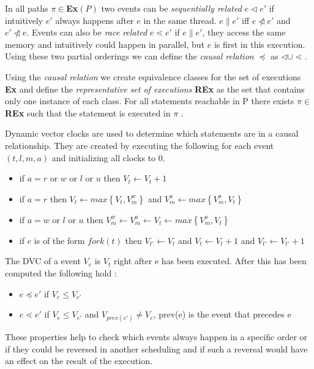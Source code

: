 \documentclass[10pt]{llncs}
\begin{document}
In all paths $\pi \in $\textbf{Ex}$(P)$ two events can be \emph{sequentially related} $e \triangleleft e'$ if intuitively $e'$ always happens after $e$ in the same thread. $e \parallel e'$ iff $e \ntriangleleft e'$ and $e' \ntriangleleft e$. Events can also be \emph{race related} $e \lessdot e'$ if $e \parallel e'$, they access the same memory and intuitively could happen in parallel, but $e$ is first in this execution. Using these two partial orderings we can define the \emph{causal relation} $\preceq$ as $\triangleleft \cup \lessdot$.

Using the \emph{causal relation} we create equivalence classes for the set of executions \textbf{Ex} and define the \emph{representative set of executions} \textbf{REx} as the set that contains only one instance of each class. For all statements reachable in P there exists $\pi \in$ \textbf{REx} such that the statement is executed in $\pi$ \cite[§4]{base4}.

Dynamic vector clocks are used to determine which statements are in a causal relationship. They are created by executing the following for each event $(t, l, m, a)$ and initializing all clocks to $0$.

\begin{itemize}
	\item if $a = r$ or $w$ or $l$ or $u$ then $V_t \leftarrow V_t + 1$
	\item if $a = r$ then $V_t \leftarrow max \left\lbrace V_t, V_m^w \right\rbrace$ and $V_m^a \leftarrow max \left\lbrace V_m^a, V_t \right\rbrace$
	\item  if $a = w$ or $l$ or $u$ then $V_m^w \leftarrow V_m^a \leftarrow V_t \leftarrow max \left\lbrace V_m^a, V_t \right\rbrace$
	\item if $e$ is of the form $fork(t)$ then $V_{t'} \leftarrow V_t$ and $V_t \leftarrow V_t + 1$ and $V_{t'} \leftarrow V_{t'} + 1$
\end{itemize}

The DVC of a event $V_e$ is $V_t$ right after e has been executed. After this has been computed the following hold \cite[§4]{base4}:

\begin{itemize}
	\item $e \preceq e'$ if $V_e \leq V_{e'}$
	\item $e \lessdot e'$ if $V_e \leq V_{e'}$ and $V_{prev(e')} \neq V_e$, prev(e) is the event that precedes e
\end{itemize}

These properties help to check which events always happen in a specific order or if they could be reversed in another scheduling and if such a reversal would have an effect on the result of the execution.
\end{document}
